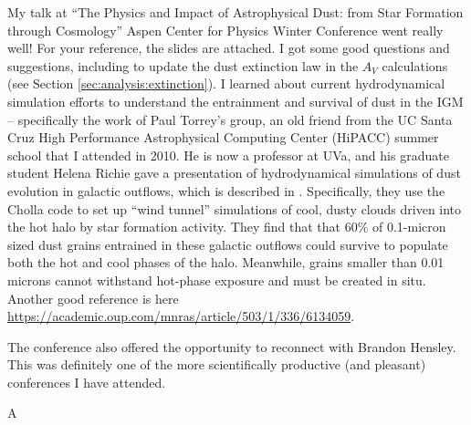\documentclass[11pt, oneside]{article}   	%
\begin{document}
My talk at ``The Physics and Impact of Astrophysical Dust: from Star Formation through Cosmology'' Aspen Center for Physics Winter Conference went really well! For your reference, the slides are attached. I got some good questions and suggestions, including to update the dust extinction law in the $A_V$ calculations (see Section \ref{sec:analysis:extinction}). I learned about current hydrodynamical simulation efforts to understand the entrainment and survival of dust in the IGM -- specifically the work of Paul Torrey's group, 
an old friend from the UC Santa Cruz High Performance Astrophysical Computing Center (HiPACC) summer school that I attended in 2010. He is now a professor at UVa, and his graduate student Helena Richie gave a presentation of hydrodynamical simulations of dust evolution in galactic outflows, which is described in \cite{2024ApJ...974...81R}. Specifically, they use the Cholla code to set up ``wind tunnel'' simulations of cool, dusty clouds driven into the hot halo by star formation activity. They find that that 60\% of 0.1-micron sized dust grains entrained in these galactic outflows could survive to populate both the hot and cool phases of the halo. Meanwhile, grains smaller than 0.01 microns cannot withstand hot-phase exposure and must be created in situ. Another good reference is here \url{https://academic.oup.com/mnras/article/503/1/336/6134059}. %

The conference also offered the opportunity to reconnect with Brandon Hensley. This was definitely one of the more scientifically productive (and pleasant) conferences I have attended. 


A
\end{document}
